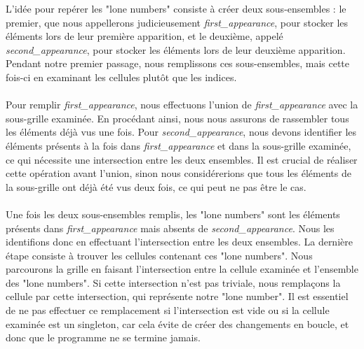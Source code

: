 \documentclass{article}
\begin{document}
L'idée pour repérer les "lone numbers" consiste à créer deux sous-ensembles : 
le premier, que nous appellerons judicieusement \textit{first\_appearance}, 
pour stocker les éléments lors de leur première apparition, et le deuxième, 
appelé \\ \textit{second\_appearance}, pour stocker les éléments lors de leur 
deuxième apparition. Pendant notre premier passage, nous remplissons ces 
sous-ensembles, mais cette fois-ci en examinant les cellules plutôt que les 
indices.
\\ \\
Pour remplir \textit{first\_appearance}, nous effectuons l'union de 
\textit{first\_appearance} avec la sous-grille examinée. En procédant ainsi, 
nous nous assurons de rassembler tous les éléments déjà vus une fois. Pour 
\textit{second\_appearance}, nous devons identifier les éléments présents à la 
fois dans \textit{first\_appearance} et dans la sous-grille examinée, ce qui 
nécessite une intersection entre les deux ensembles. Il est crucial de réaliser 
cette opération avant l'union, sinon nous considérerions que tous les éléments 
de la sous-grille ont déjà été vus deux fois, ce qui peut ne pas être le cas.
\\ \\
Une fois les deux sous-ensembles remplis, les "lone numbers" sont les éléments 
présents dans \textit{first\_appearance} mais absents de 
\textit{second\_appearance}. Nous les identifions donc en effectuant 
l'intersection entre les deux ensembles. La dernière étape consiste à trouver 
les cellules contenant ces "lone numbers". Nous parcourons la grille en faisant
l'intersection entre la cellule examinée et l'ensemble des "lone numbers". Si 
cette intersection n'est pas triviale, nous remplaçons la cellule par cette 
intersection, qui représente notre "lone number". Il est essentiel de ne pas 
effectuer ce remplacement si l'intersection est vide ou si la cellule examinée 
est un singleton, car cela évite de créer des changements en boucle, et donc 
que le programme ne se termine jamais.
\end{document}
